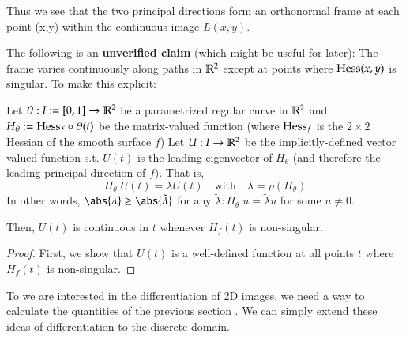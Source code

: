   Thus we see that the two principal directions form an orthonormal frame at each point (x,y) within the continuous image $L(x,y)$.
  
  The following is an \textbf{unverified claim} (which might be useful for later):
  The frame varies continuously along paths in $\mathbb{R}^2$
  except at points where $\mathrm{Hess}(x,y)$ is singular.
  To make this explicit:
  
  \begin{theorem}
     	Let $\theta: I:= [0,1] \to \mathbb{R}^2$ be a parametrized regular curve in $\mathbb{R}^2$ and
     	$H_\theta := \mathrm{Hess}_f  \circ \theta(t)$ be the matrix-valued function
     	(where $\mathrm{Hess}_f$ is the $2\times 2$ Hessian of the smooth surface $f$)
     	Let $U:I \to \mathbb{R}^2$ be the implicitly-defined vector valued function s.t.
     	$U(t)$ is the leading eigenvector of $H_\theta$
     	(and therefore the leading principal direction of $f$). That is,
     	\begin{equation}
     	H_\theta \; U(t) = \lambda U(t) \quad \textrm{with}\quad \lambda = \rho(H_\theta)
     	\end{equation}
     	In other words, $\abs{\lambda} \ge \abs{\tilde{\lambda}}$ for any
     	$\tilde{\lambda} : H_\theta \; u = \tilde{\lambda} u$ for some $u \ne 0$.
     	
     	Then, $U(t)$ is continuous in $t$ whenever $H_f(t)$ is non-singular.
  \end{theorem}
  \begin{proof}
     	First, we show that $U(t)$ is a well-defined function at all points $t$ where
     	$H_f(t)$ is non-singular.
  \end{proof}
  
   To we are interested in the differentiation of 2D images, we need a way
  to calculate the quantities of the previous section . We can simply extend these ideas of differentiation to the discrete domain.

